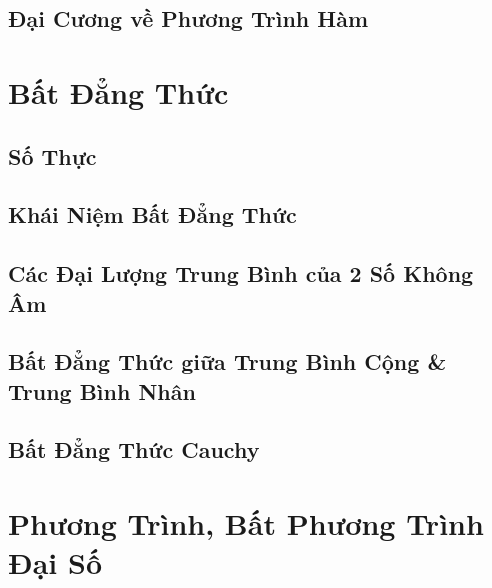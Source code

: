 \documentclass{article}
\numberwithin{equation}{section}
\begin{document}

\subsection{Đại Cương về Phương Trình Hàm}


\section{Bất Đẳng Thức}

\subsection{Số Thực}


\subsection{Khái Niệm Bất Đẳng Thức}


\subsection{Các Đại Lượng Trung Bình của 2 Số Không Âm}


\subsection{Bất Đẳng Thức giữa Trung Bình Cộng \& Trung Bình Nhân}


\subsection{Bất Đẳng Thức Cauchy}


\section{Phương Trình, Bất Phương Trình Đại Số}
\end{document}
